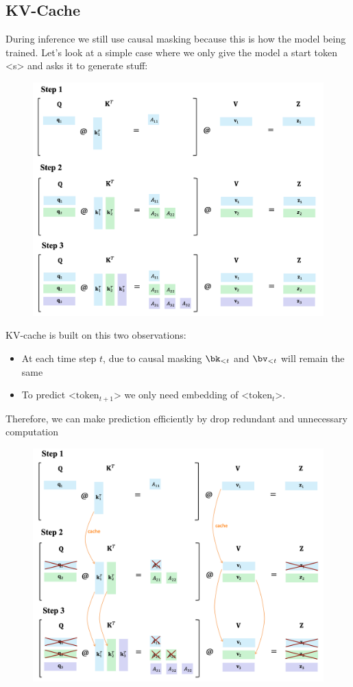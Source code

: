 \documentclass{article}
\begin{document}
\subsection{KV-Cache}
During inference we still use causal masking because this is how the model being trained.
Let's look at a simple case where we only give the model a start token <s> and asks it to generate stuff:
\begin{figure}[!h]
\centering
\includegraphics[scale=0.28]{imgs/no-cache.png}
\end{figure}

KV-cache is built on this two observations:
\begin{itemize}
	\item At each time step $t$, due to causal masking $\bk_{<t}$ and $\bv_{<t}$ will remain the same
	\item To predict <$\text{token}_{t+1}$> we only need embedding of <$\text{token}_{t}$>.
\end{itemize}
Therefore, we can make prediction efficiently by drop redundant and unnecessary computation
\begin{figure}[!h]
\centering
\includegraphics[scale=0.28]{imgs/cache.png}
\end{figure}
\end{document}
